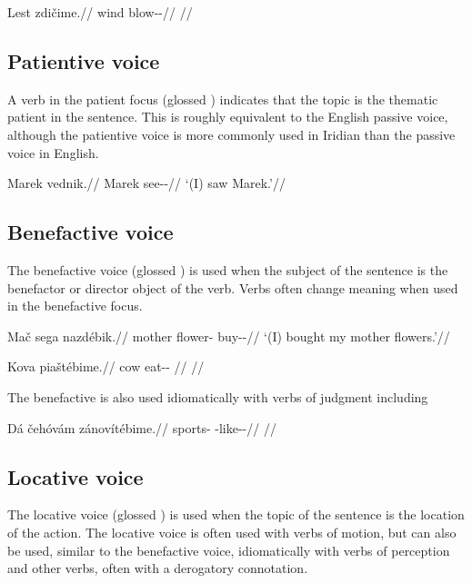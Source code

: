 \pex
\begingl
\gla Lest zdičime.//
\glb wind blow-\Av{}-\Prog{}//
\glft {}//
\endgl
\xe

\subsection{Patientive voice}

A verb in the patient focus (glossed \Pv{}) indicates that the topic is the
thematic patient in the sentence. This is roughly equivalent to the English
passive voice, although the patientive voice is more commonly used in Iridian
than the passive voice in English. 

\pex
\begingl
\gla Marek vednik.//
\glb Marek see-\Pv{}-\Pfv{}//
\glft `(I) saw Marek.'//
\endgl
\xe


\subsection{Benefactive voice}

The benefactive voice (glossed \Ben{}) is used when the subject of the
sentence is the benefactor or director object of the verb. Verbs often change
meaning when used in the benefactive focus.


\begin{multicols}{2}
\pex
\begingl
\gla Mač sega nazdébik.//
\glb mother flower-\Acc{} buy-\Ben{}-\Pf{}//
\glft `(I) bought my mother flowers.'//
\endgl
\xe

\pex
\begingl
\gla Kova piaštébime.//
\glb cow eat-\Ben{}-\Prog{} //
\glft {}//
\endgl
\xe

\end{multicols}

The benefactive is also used idiomatically with verbs of judgment including
 

\pex
\begingl
\gla Dá čehóvám zánovítébime.//
\glb \First\Sg{} sports-\Agt{} \Neg{}-like-\Ben{}-\Prog{}//
\glft {}//
\endgl
\xe

\subsection{Locative voice}

The locative voice (glossed \Lv{}) is used when the topic of the sentence is
the location of the action. The locative voice is often used with verbs of
motion, but can also be used, similar to the benefactive voice, idiomatically
with verbs of perception and other verbs, often with a derogatory connotation.

